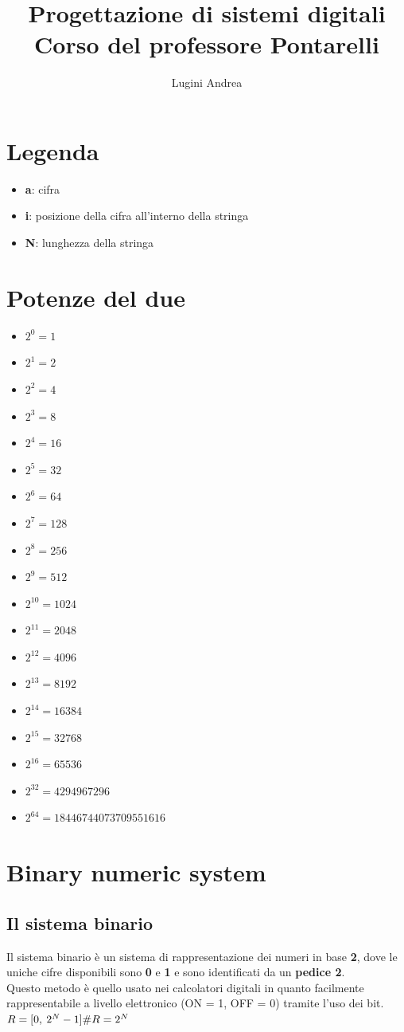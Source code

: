 \documentclass{report}
\title{%
    Progettazione di sistemi digitali \\    
    \large Corso del professore Pontarelli
}
\author{Lugini Andrea}
\begin{document}
\maketitle
\tableofcontents
\newpage
\section{Legenda}
    \begin{itemize}
        \item \textbf{a}: cifra
        \item \textbf{i}: posizione della cifra all'interno della stringa
        \item \textbf{N}: lunghezza della stringa
    \end{itemize}
\section{Potenze del due}
    \begin{itemize}
        \item $2^0 = 1$
        \item $2^1 = 2$
        \item $2^2 = 4$
        \item $2^3 = 8$
        \item $2^4 = 16$
        \item $2^5 = 32$
        \item $2^6 = 64$
        \item $2^7 = 128$
        \item $2^8 = 256$
        \item $2^9 = 512$
        \item $2^{10} = 1024$
        \item $2^{11} = 2048$
        \item $2^{12} = 4096$
        \item $2^{13} = 8192$
        \item $2^{14} = 16384$
        \item $2^{15} = 32768$
        \item $2^{16} = 65536$
        \item $2^{32} = 4294967296$
        \item $2^{64} = 18446744073709551616$
    \end{itemize}
\section{Binary numeric system}
    \subsection{Il sistema binario}
        Il sistema binario è un sistema di rappresentazione dei numeri in base
        \textbf{2}, dove le uniche cifre disponibili sono \textbf{0} e \textbf{1} 
        e sono identificati da un \textbf{pedice 2}. \\
        Questo metodo è quello usato nei calcolatori digitali in quanto facilmente
        rappresentabile a livello elettronico (ON = 1, OFF = 0) tramite l'uso dei bit. \\
        $R = [0, \: 2^N - 1] \\
        \#R = 2^N$
\end{document}

